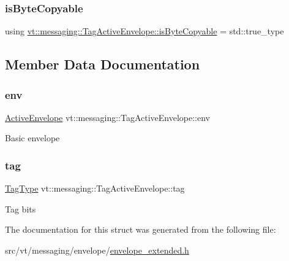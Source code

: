 \subsubsection{\texorpdfstring{is\+Byte\+Copyable}{isByteCopyable}}
{\footnotesize\ttfamily using \hyperlink{structvt_1_1messaging_1_1_tag_active_envelope_a25b95de57b90351e8b017ea2742eadc2}{vt\+::messaging\+::\+Tag\+Active\+Envelope\+::is\+Byte\+Copyable} =  std\+::true\+\_\+type}



\subsection{Member Data Documentation}
\mbox{\label{structvt_1_1messaging_1_1_tag_active_envelope_a407d7bb06664c813df052dac889f8f3a}} 
\subsubsection{\texorpdfstring{env}{env}}
{\footnotesize\ttfamily \hyperlink{structvt_1_1messaging_1_1_active_envelope}{Active\+Envelope} vt\+::messaging\+::\+Tag\+Active\+Envelope\+::env}

Basic envelope \mbox{\label{structvt_1_1messaging_1_1_tag_active_envelope_ab5fdfcb898f8e0ca0b5c580018824766}} 
\subsubsection{\texorpdfstring{tag}{tag}}
{\footnotesize\ttfamily \hyperlink{namespacevt_a84ab281dae04a52a4b243d6bf62d0e52}{Tag\+Type} vt\+::messaging\+::\+Tag\+Active\+Envelope\+::tag}

Tag bits 

The documentation for this struct was generated from the following file\+:\begin{DoxyCompactItemize}
\item 
src/vt/messaging/envelope/\hyperlink{envelope__extended_8h}{envelope\+\_\+extended.\+h}\end{DoxyCompactItemize}
